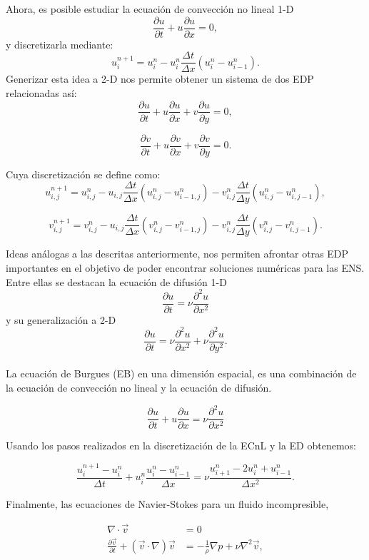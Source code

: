 \documentclass[A4,10pt]{article}
\begin{document}
\begin{multicols}{2}
Ahora, es posible estudiar la ecuación de convección no lineal 1-D 
$$\frac{\partial u}{\partial t} + u \frac{\partial u}{\partial x} = 0,$$
y discretizarla mediante:
$$u_i^{n+1} = u_i^n - u_i^n \frac{\Delta t}{\Delta x} (u_i^n - u_{i-1}^n).$$
Generizar esta idea a 2-D nos permite obtener un sistema de dos EDP relacionadas así:
$$\frac{\partial u}{\partial t} + u \frac{\partial u}{\partial x} + v \frac{\partial u}{\partial y} = 0,$$

$$\frac{\partial v}{\partial t} + u \frac{\partial v}{\partial x} + v \frac{\partial v}{\partial y} = 0.$$

Cuya discretización se define como:
$$ u_{i,j}^{n+1} = u_{i,j}^n - u_{i,j} \frac{\Delta t}{\Delta x} (u_{i,j}^n-u_{i-1,j}^n) - v_{i,j}^n \frac{\Delta t}{\Delta y} (u_{i,j}^n-u_{i,j-1}^n),$$

$$v_{i,j}^{n+1} = v_{i,j}^n - u_{i,j} \frac{\Delta t}{\Delta x} (v_{i,j}^n-v_{i-1,j}^n) - v_{i,j}^n \frac{\Delta t}{\Delta y} (v_{i,j}^n-v_{i,j-1}^n).$$

Ideas análogas a las descritas anteriormente, nos permiten afrontar otras EDP importantes en el objetivo de poder encontrar soluciones numéricas para las ENS. Entre ellas se destacan la ecuación de difusión 1-D 
$$\frac{\partial u}{\partial t}= \nu \frac{\partial^2 u}{\partial x^2}$$
y su generalización a 2-D
$$\frac{\partial u}{\partial t} = \nu \frac{\partial ^2 u}{\partial x^2} + \nu \frac{\partial ^2 u}{\partial y^2}.$$
\\
La ecuación de Burgues (EB) en una dimensión espacial, es una combinación de la ecuación de convección no lineal y la ecuación de difusión.

$$\frac{\partial u}{\partial t} + u \frac{\partial u}{\partial x} = \nu \frac{\partial ^2u}{\partial x^2}$$

Usando los pasos realizados en la discretización de la ECnL y la ED obtenemos:

$$\frac{u_i^{n+1}-u_i^n}{\Delta t} + u_i^n \frac{u_i^n - u_{i-1}^n}{\Delta x} = \nu \frac{u_{i+1}^n - 2u_i^n + u_{i-1}^n}{\Delta x^2}.$$


Finalmente, las ecuaciones de Navier-Stokes para un fluido incompresible, 

\begin{equation*}
	\begin{split}
	\nabla \cdot\vec{v} &= 0 \\
	\frac{\partial \vec{v}}{\partial t}+(\vec{v}\cdot\nabla)\vec{v} &= -\frac{1}{\rho}\nabla p + \nu \nabla^2\vec{v},
	\end{split}
\end{equation*}


\end{multicols}
\end{document}
